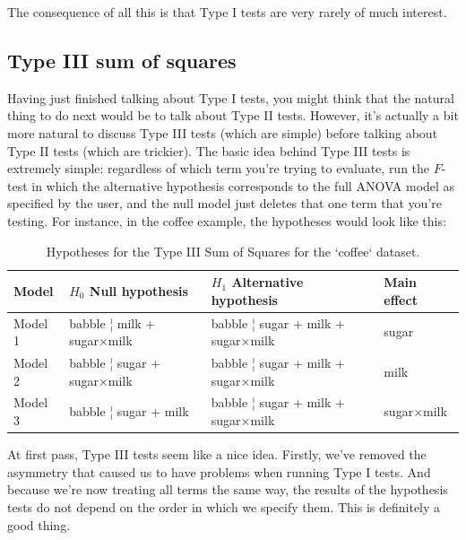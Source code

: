 \documentclass[
]{book}
\theoremstyle{definition}
\theoremstyle{definition}
\theoremstyle{definition}
\theoremstyle{definition}
\theoremstyle{remark}
\begin{document}
The consequence of all this is that Type I tests are very rarely of much interest.

\hypertarget{type-iii-sum-of-squares}{%
\subsection{Type III sum of squares}\label{type-iii-sum-of-squares}}

Having just finished talking about Type I tests, you might think that the natural thing to do next would be to talk about Type II tests. However, it's actually a bit more natural to discuss Type III tests (which are simple) before talking about Type II tests (which are trickier). The basic idea behind Type III tests is extremely simple: regardless of which term you're trying to evaluate, run the \(F\)-test in which the alternative hypothesis corresponds to the full ANOVA model as specified by the user, and the null model just deletes that one term that you're testing. For instance, in the coffee example, the hypotheses would look like this:

\begin{table}[!h]

\caption{\label{tab:unnamed-chunk-93}Hypotheses for the Type III Sum of Squares for the `coffee` dataset.}
\centering
\begin{tabular}[t]{llll}
\toprule
Model & $H_0$ Null hypothesis & $H_1$ Alternative hypothesis & Main effect\\
\midrule
Model 1 & babble ¦ milk + sugar×milk & babble ¦ sugar + milk + sugar×milk & sugar\\
Model 2 & babble ¦ sugar + sugar×milk & babble ¦ sugar + milk + sugar×milk & milk\\
Model 3 & babble ¦ sugar + milk & babble ¦ sugar + milk + sugar×milk & sugar×milk\\
\bottomrule
\end{tabular}
\end{table}

At first pass, Type III tests seem like a nice idea. Firstly, we've removed the asymmetry that caused us to have problems when running Type I tests. And because we're now treating all terms the same way, the results of the hypothesis tests do not depend on the order in which we specify them. This is definitely a good thing.
\end{document}
